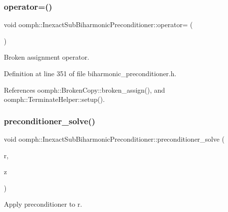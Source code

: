 \subsubsection{\texorpdfstring{operator=()}{operator=()}}
{\footnotesize\ttfamily void oomph\+::\+Inexact\+Sub\+Biharmonic\+Preconditioner\+::operator= (\begin{DoxyParamCaption}\item[{const \hyperlink{classoomph_1_1InexactSubBiharmonicPreconditioner}{Inexact\+Sub\+Biharmonic\+Preconditioner} \&}]{ }\end{DoxyParamCaption})\hspace{0.3cm}{\ttfamily [inline]}}



Broken assignment operator. 



Definition at line 351 of file biharmonic\+\_\+preconditioner.\+h.



References oomph\+::\+Broken\+Copy\+::broken\+\_\+assign(), and oomph\+::\+Terminate\+Helper\+::setup().

\mbox{\label{classoomph_1_1InexactSubBiharmonicPreconditioner_af15b753e7631a5f6de0bb33cebf37fad}} 
\subsubsection{\texorpdfstring{preconditioner\+\_\+solve()}{preconditioner\_solve()}}
{\footnotesize\ttfamily void oomph\+::\+Inexact\+Sub\+Biharmonic\+Preconditioner\+::preconditioner\+\_\+solve (\begin{DoxyParamCaption}\item[{const \hyperlink{classoomph_1_1DoubleVector}{Double\+Vector} \&}]{r,  }\item[{\hyperlink{classoomph_1_1DoubleVector}{Double\+Vector} \&}]{z }\end{DoxyParamCaption})\hspace{0.3cm}{\ttfamily [virtual]}}



Apply preconditioner to r. 

